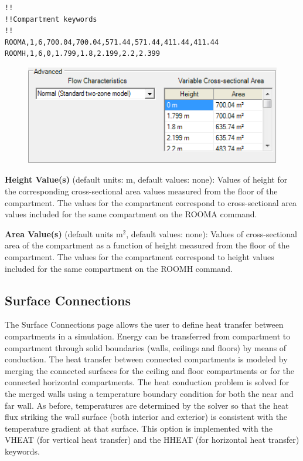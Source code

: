 \begin{lstlisting}
!!
!!Compartment keywords
!!
ROOMA,1,6,700.04,700.04,571.44,571.44,411.44,411.44
ROOMH,1,6,0,1.799,1.8,2.199,2.2,2.399
\end{lstlisting}

\begin{figure}[h!]
\begin{center}
\includegraphics[width=4.5in]{FIGURES/Input_File/Variable_Area}
\end{center}
\end{figure}

\textbf{Height Value(s)} (default units: m, default values: none): Values of height for the corresponding cross-sectional area values measured from the floor of the compartment. The values for the compartment correspond to cross-sectional area values included for the same compartment on the ROOMA command.

\textbf{Area Value(s)} (default units m$^2$, default values: none): Values of cross-sectional area of the compartment as a function of height measured from the floor of the compartment. The values for the compartment correspond to height values included for the same compartment on the ROOMH command.

\subsection{Surface Connections}

The Surface Connections page allows the user to define heat transfer between compartments in a simulation. Energy can be transferred from compartment to compartment through solid boundaries (walls, ceilings and floors) by means of conduction. The heat transfer between connected compartments is modeled by merging the connected surfaces for the ceiling and floor compartments or for the connected horizontal compartments.  The heat conduction problem is solved for the merged walls using a temperature boundary condition for both the near and far wall. As before, temperatures are determined by the solver so that the heat flux striking the wall surface (both interior and exterior) is consistent with the temperature gradient at that surface.  This option is implemented with the VHEAT (for vertical heat transfer) and the HHEAT (for horizontal heat transfer) keywords.

